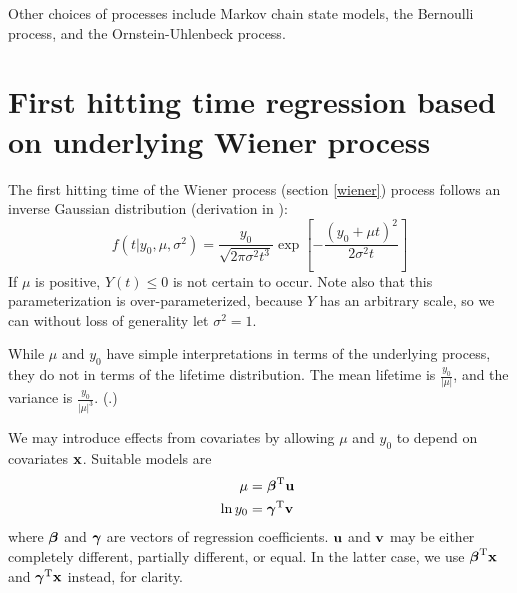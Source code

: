 Other choices of processes include Markov chain state models, the Bernoulli process, and the Ornstein-Uhlenbeck process.

\section{First hitting time regression based on underlying Wiener process}
The first hitting time of the Wiener process (section \ref{wiener}) process follows an inverse Gaussian distribution (derivation in \cite[23-29]{chhikara1988}):
\begin{equation}
\label{eq:fht-ig}
    f(t|y_0,\mu,\sigma^2)=\frac{y_0}{\sqrt{2\pi\sigma^2t^3}}\exp\left[-\frac{(y_0+\mu t)^2}{2\sigma^2t}\right]
\end{equation}
If $\mu$ is positive, $Y(t)\leq 0$ is not certain to occur. Note also that this parameterization is over-parameterized, because $Y$ has an arbitrary scale, so we can without loss of generality let $\sigma^2=1$.

While $\mu$ and $y_0$ have simple interpretations in terms of the underlying process, they do not in terms of the lifetime distribution. The mean lifetime is $\frac{y_0}{|\mu|}$, and the variance is $\frac{y_0}{|\mu|^3}$. (\cite[62]{caroni2017}.)

We may introduce effects from covariates by allowing $\mu$ and $y_0$ to depend on covariates $\mathbf{x}$. Suitable models are
\begin{align}
    \mu&=\bbeta^\T\u \\
    \ln y_0&=\bgamma^\T\v
\end{align}
where $\boldsymbol{\beta}$ and $\boldsymbol{\gamma}$ are vectors of regression coefficients. $\mathbf{u}$ and $\mathbf{v}$ may be either completely different, partially different, or equal. In the latter case, we use $\boldsymbol{\beta}^{\text{T}}\mathbf{x}$ and $\boldsymbol{\gamma}^{\text{T}}\mathbf{x}$ instead, for clarity.